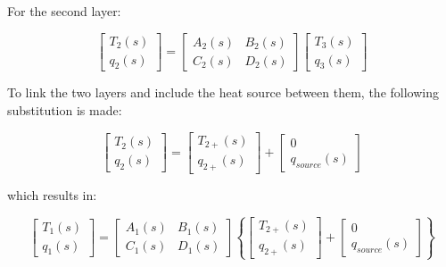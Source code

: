 For the second layer:

\begin{equation}
\left[ {\begin{array}{*{20}{c}}{{T_2}\left( s \right)}\\ {{q_2}\left( s \right)}\end{array}} \right] = \left[ {\begin{array}{*{20}{c}}{{A_2}\left( s \right)}&{{B_2}\left( s \right)}\\ {{C_2}\left( s \right)}&{{D_2}\left( s \right)}\end{array}} \right]\left[ {\begin{array}{*{20}{c}}{{T_3}\left( s \right)}\\ {{q_3}\left( s \right)}\end{array}} \right]
\end{equation}

To link the two layers and include the heat source between them, the following substitution is made:

\begin{equation}
\left[ {\begin{array}{*{20}{c}}{{T_2}\left( s \right)}\\ {{q_2}\left( s \right)}\end{array}} \right] = \left[ {\begin{array}{*{20}{c}}{{T_{2 + }}\left( s \right)}\\ {{q_{2 + }}\left( s \right)}\end{array}} \right] + \left[ {\begin{array}{*{20}{c}}0\\ {{q_{source}}\left( s \right)}\end{array}} \right]
\end{equation}

which results in:

\begin{equation}
\left[ {\begin{array}{*{20}{c}}{{T_1}\left( s \right)}\\ {{q_1}\left( s \right)}\end{array}} \right] = \left[ {\begin{array}{*{20}{c}}{{A_1}\left( s \right)}&{{B_1}\left( s \right)}\\ {{C_1}\left( s \right)}&{{D_1}\left( s \right)}\end{array}} \right]\left\{ {\left[ {\begin{array}{*{20}{c}}{{T_{2 + }}\left( s \right)}\\ {{q_{2 + }}\left( s \right)}\end{array}} \right] + \left[ {\begin{array}{*{20}{c}}0\\ {{q_{source}}\left( s \right)}\end{array}} \right]} \right\}
\end{equation}

